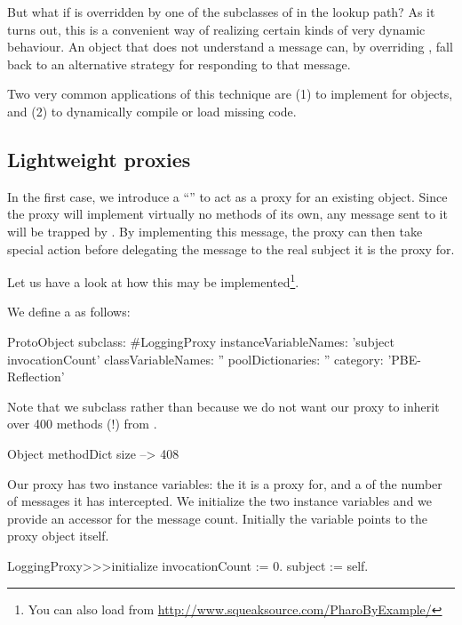 \documentclass[a4paper,10pt,twoside]{book}
\begin{document}
But what if  is overridden by one of the subclasses of  in the lookup path?
As it turns out, this is a convenient way of realizing certain kinds of very dynamic behaviour. An object that does not understand a message can, by overriding , fall back to an alternative strategy for responding to that message.

Two very common applications of this technique are (1) to implement  for objects, and (2) to dynamically compile or load missing code.

\subsection{Lightweight proxies}

In the first case, we introduce a ``'' to act as a proxy for an existing object.
Since the proxy will implement virtually no methods of its own, any message sent to it will be trapped by . By implementing this message, the proxy can then take special action before delegating the message to the real subject it is the proxy for.

Let us have a look at how this may be implemented\footnote{You can also load  from \url{http://www.squeaksource.com/PharoByExample/}}.

We define a  as follows:
\begin{code}{}
ProtoObject subclass: #LoggingProxy
        instanceVariableNames: 'subject invocationCount'
        classVariableNames: ''
        poolDictionaries: ''
        category: 'PBE-Reflection'
\end{code}
Note that we subclass  rather than  because we do not want our proxy to inherit over 400 methods (!) from .

\begin{code}{}
Object methodDict size --> 408
\end{code}

Our proxy has two instance variables: the  it is a proxy for, and a  of the number of messages it has intercepted.
We initialize the two instance variables and we provide an accessor for the message count.
Initially the  variable points to the proxy object itself.
\begin{code}{}
LoggingProxy>>>initialize
        invocationCount := 0.
        subject := self.
\end{code}
\end{document}
